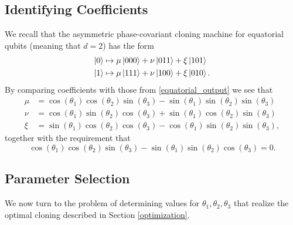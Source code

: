 \documentclass[reqno]{amsart}
\numberwithin{lemma}{section}
\numberwithin{proposition}{section}
\begin{document}
{\subsection{Identifying Coefficients}
We recall that the asymmetric phase-covariant cloning machine for equatorial qubits (meaning that $d=2$) has the form
\begin{equation*}
\begin{aligned}
\ket{0} &\mapsto \mu \ket{000} + \nu \ket{011} + \xi \ket{101}\\
\ket{1} &\mapsto \mu \ket{111} + \nu \ket{100} + \xi \ket{010}.
\end{aligned}
\end{equation*}
By comparing coefficients with those from \eqref{equatorial_output} we see that
\begin{equation}
\label{coeffs_angles}
\begin{aligned}
\mu &= \cos(\theta_{1}) \cos(\theta_{2}) \sin(\theta_{3}) - \sin(\theta_{1}) \sin(\theta_{2}) \sin(\theta_{3})\\
\nu &= \cos(\theta_{1}) \sin(\theta_{2}) \cos(\theta_{3}) + \sin(\theta_{1}) \cos(\theta_{2}) \sin(\theta_{3})\\
\xi &= \sin(\theta_{1}) \cos(\theta_{2}) \cos(\theta_{3}) - \cos(\theta_{1}) \sin(\theta_{2}) \sin(\theta_{3}),
\end{aligned}
\end{equation}
together with the requirement that
\begin{equation}
\label{zero_condition}
 \cos(\theta_{1}) \cos(\theta_{2}) \sin(\theta_{3}) - \sin(\theta_{1}) \sin(\theta_{2}) \cos(\theta_{3}) = 0.
\end{equation}

\subsection{Parameter Selection}
We now turn to the problem of determining values for $\theta_{1}, \theta_{2}, \theta_{3}$ that realize the optimal cloning described in Section \ref{optimization}.

}
\end{document}
